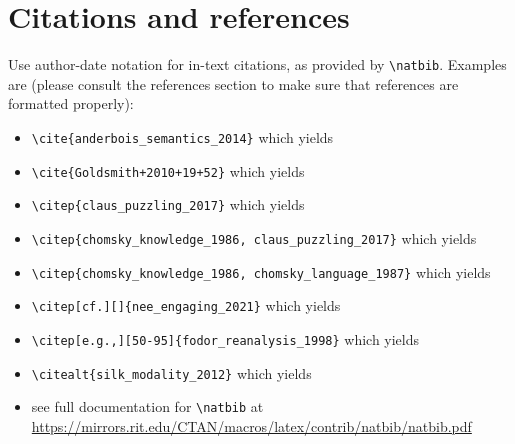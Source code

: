 \documentclass[12pt, letterpaper]{article}
\begin{document}
    \section{Citations and references}
    Use author-date notation for in-text citations, as provided by \verb=\natbib=.
    Examples are (please consult the references section to make sure that references
    are formatted properly):
    \begin{itemize}
        \item \verb=\cite{anderbois_semantics_2014}= which yields \cite{anderbois_semantics_2014}

        \item \verb=\cite{Goldsmith+2010+19+52}= which yields \cite{Goldsmith+2010+19+52}

        \item \verb=\citep{claus_puzzling_2017}= which yields \citep{claus_puzzling_2017}

        \item \verb=\citep{chomsky_knowledge_1986, claus_puzzling_2017}= which yields
            \citep{chomsky_knowledge_1986, claus_puzzling_2017}

        \item \verb=\citep{chomsky_knowledge_1986, chomsky_language_1987}= which yields
            \citep{chomsky_knowledge_1986, chomsky_language_1987}

        \item \verb=\citep[cf.][]{nee_engaging_2021}= which yields \citep[cf.][]{nee_engaging_2021}

        \item \verb=\citep[e.g.,][50-95]{fodor_reanalysis_1998}= which yields \citep[e.g.,][50-95]{fodor_reanalysis_1998}

        \item \verb=\citealt{silk_modality_2012}= which yields \citealt{silk_modality_2012}

        \item see full documentation for \verb=\natbib= at\\
            \href{https://mirrors.rit.edu/CTAN/macros/latex/contrib/natbib/natbib.pdf}{https://mirrors.rit.edu/CTAN/macros/latex/contrib/natbib/natbib.pdf}
    \end{itemize}
\end{document}

